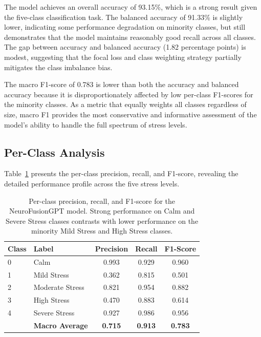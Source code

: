 \documentclass[12pt,letterpaper]{report}
\begin{document}
The model achieves an overall accuracy of 93.15\%, which is a strong result given the five-class classification task. The balanced accuracy of 91.33\% is slightly lower, indicating some performance degradation on minority classes, but still demonstrates that the model maintains reasonably good recall across all classes. The gap between accuracy and balanced accuracy (1.82 percentage points) is modest, suggesting that the focal loss and class weighting strategy partially mitigates the class imbalance bias.

The macro F1-score of 0.783 is lower than both the accuracy and balanced accuracy because it is disproportionately affected by low per-class F1-scores for the minority classes. As a metric that equally weights all classes regardless of size, macro F1 provides the most conservative and informative assessment of the model's ability to handle the full spectrum of stress levels.

\subsection{Per-Class Analysis}

Table~\ref{tab:per_class} presents the per-class precision, recall, and F1-score, revealing the detailed performance profile across the five stress levels.

\begin{table}[H]
\centering
\caption[Per-class classification metrics]{Per-class precision, recall, and F1-score for the NeuroFusionGPT model. Strong performance on Calm and Severe Stress classes contrasts with lower performance on the minority Mild Stress and High Stress classes.}
\label{tab:per_class}
\begin{tabular}{llccc}
\toprule
\textbf{Class} & \textbf{Label} & \textbf{Precision} & \textbf{Recall} & \textbf{F1-Score} \\
\midrule
0 & Calm & 0.993 & 0.929 & 0.960 \\
1 & Mild Stress & 0.362 & 0.815 & 0.501 \\
2 & Moderate Stress & 0.821 & 0.954 & 0.882 \\
3 & High Stress & 0.470 & 0.883 & 0.614 \\
4 & Severe Stress & 0.927 & 0.986 & 0.956 \\
\midrule
& \textbf{Macro Average} & \textbf{0.715} & \textbf{0.913} & \textbf{0.783} \\
\bottomrule
\end{tabular}
\end{table}
\end{document}
